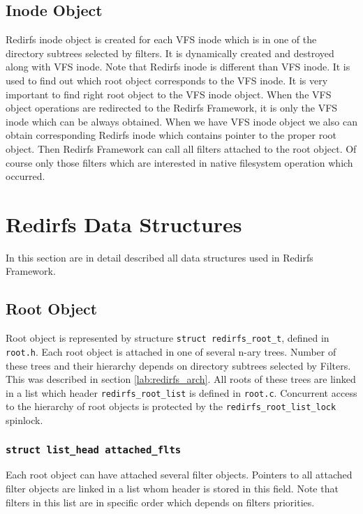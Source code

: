 \subsection{Inode Object}
Redirfs inode object is created for each VFS inode which is in one of the directory
subtrees selected by filters. It is dynamically created and destroyed along with VFS
inode. Note that Redirfs inode is different than VFS inode. It is used to find out
which root object corresponds to the VFS inode. It is very important to find right
root object to the VFS inode object. When the VFS object operations are redirected to
the Redirfs Framework, it is only the VFS inode which can be always obtained. When
we have VFS inode object we also can obtain corresponding Redirfs inode which contains
pointer to the proper root object. Then Redirfs Framework can call all filters
attached to the root object. Of course only those filters which are interested in native
filesystem operation which occurred.

\section{Redirfs Data Structures}
\label{lab:redirfs_data_struct}
In this section are in detail described all data structures used in Redirfs Framework.

\subsection{Root Object}
Root object is represented by structure \texttt{struct redirfs\_root\_t}, defined in
\texttt{root.h}. Each root object is attached in one of several n-ary trees. Number of
these trees and their hierarchy depends on directory subtrees selected by Filters. This was
described in section \ref{lab:redirfs_arch}. All roots of these trees are linked in a list
which header \texttt{redirfs\_root\_list} is defined in \texttt{root.c}. Concurrent
access to the hierarchy of root objects is protected by the
\texttt{redirfs\_root\_list\_lock} spinlock.

\subsubsection{\texttt{struct list\_head attached\_flts}}
Each root object can have attached several filter objects. Pointers to all attached
filter objects are linked in a list whom header is stored in this field. Note that
filters in this list are in specific order which depends on filters priorities.

